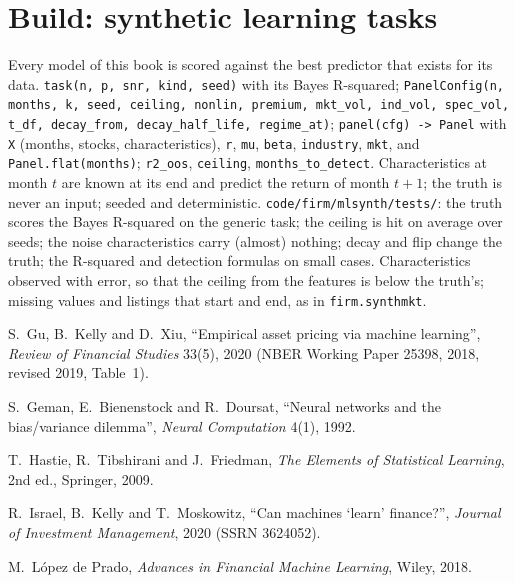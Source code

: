 \section{Build: synthetic learning tasks}\label{bld:ml:why-financial-machine-learning-is-different:mlsynth}

\begin{build}
 Every model of this book is scored against the best predictor that exists for its data.
 \texttt{task(n, p, snr, kind, seed)} with its Bayes R-squared; \texttt{PanelConfig(n, months, k,
seed, ceiling, nonlin, premium, mkt\_vol, ind\_vol, spec\_vol, t\_df, decay\_from, decay\_half\_life, regime\_at)};
\texttt{panel(cfg) -> Panel} with \texttt{X} (months, stocks, characteristics), \texttt{r}, \texttt{mu},
\texttt{beta}, \texttt{industry}, \texttt{mkt}, and \texttt{Panel.flat(months)}; \texttt{r2\_oos},
\texttt{ceiling}, \texttt{months\_to\_detect}.
 Characteristics at month $t$ are known at its end and predict the return of month $t+1$; the truth is
never an input; seeded and deterministic.
 \texttt{code/firm/mlsynth/tests/}: the truth scores the Bayes R-squared on the generic task;
the ceiling is hit on average over seeds; the noise characteristics carry (almost) nothing; decay and flip change the
truth; the R-squared and detection formulas on small cases.
 Characteristics observed with error, so that the ceiling from the features is below the truth's;
missing values and listings that start and end, as in \texttt{firm.synthmkt}.
\end{build}

\begin{omsources}
\item S.~Gu, B.~Kelly and D.~Xiu, ``Empirical asset pricing via machine learning'', \emph{Review of Financial Studies}
33(5), 2020 (NBER Working Paper 25398, 2018, revised 2019, Table~1).
\item S.~Geman, E.~Bienenstock and R.~Doursat, ``Neural networks and the bias/variance dilemma'', \emph{Neural
Computation} 4(1), 1992.
\item T.~Hastie, R.~Tibshirani and J.~Friedman, \emph{The Elements of Statistical Learning}, 2nd ed., Springer, 2009.
\item R.~Israel, B.~Kelly and T.~Moskowitz, ``Can machines `learn' finance?'', \emph{Journal of Investment Management},
2020 (SSRN 3624052).
\item M.~López de Prado, \emph{Advances in Financial Machine Learning}, Wiley, 2018.
\end{omsources}


